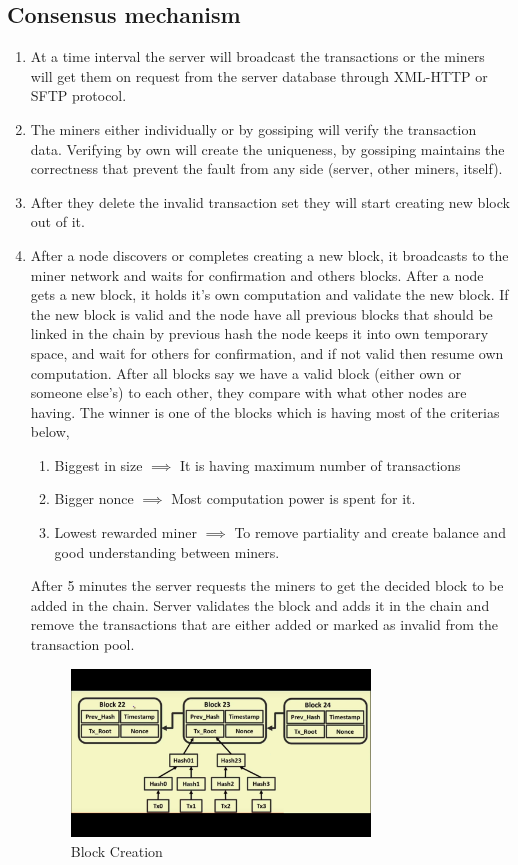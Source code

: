 \subsection{Consensus mechanism}
\begin{enumerate}
\item At a time interval the server will broadcast the transactions or the miners will get them on request from the server database through XML-HTTP or SFTP protocol.
\item The miners either individually or by gossiping will verify the transaction data. Verifying by own will create the uniqueness, by gossiping maintains the correctness that prevent the fault from any side (server, other miners, itself).
\item After they delete the invalid transaction set they will start creating new block out of it.
\item After a node discovers or completes creating a new block, it broadcasts to the miner network and waits for confirmation and others blocks. After a node gets a new block, it holds it's own computation and validate the new block. If the new block is valid and the node have all previous blocks that should be linked in the chain by previous hash the node keeps it into own temporary space, and wait for others for confirmation, and if not valid then resume own computation. After all blocks say we have a valid block (either own or someone else's) to each other, they compare with what other nodes are having. The winner is one of the blocks which is having most of the criterias below,
\begin{enumerate}
\item Biggest in size $\implies$ It is having maximum number of transactions
\item Bigger nonce $\implies$ Most computation power is spent for it.
\item Lowest rewarded miner $\implies$ To remove partiality and create balance and good understanding between miners.
\end{enumerate}
After 5 minutes the server requests the miners to get the decided block to be added in the chain. Server validates the block and adds it in the chain and remove the transactions that are either added or marked as invalid from the transaction pool.

\begin{figure}
\begin{center}
\includegraphics[width=0.75\textwidth]{./img_src/block_chain.png}
\end{center}
\caption{Block Creation}
\end{figure}


\end{enumerate}
